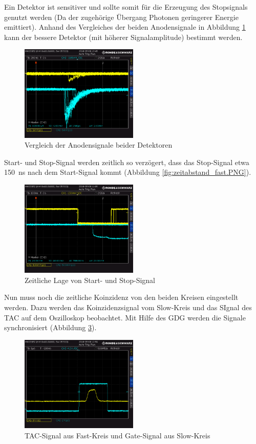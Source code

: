 Ein Detektor ist sensitiver und sollte somit für die Erzeugung des Stopsignals genutzt werden (Da der zugehörige Übergang Photonen geringerer Energie emittiert). Anhand des Vergleiches der beiden Anodensignale in Abbildung \ref{fig:detektorvergleich} kann der bessere Detektor (mit höherer Signalamplitude) bestimmt werden.
\begin{figure}[h]
  \centering
  \includegraphics[width=0.5\textwidth]{data/oszi/detektorvergleich.PNG}
  \caption{Vergleich der Anodensignale beider Detektoren}
  \label{fig:detektorvergleich}
\end{figure}

Start- und Stop-Signal werden zeitlich so verzögert, dass das Stop-Signal etwa \SI{150}{\nano\second} nach dem Start-Signal kommt (Abbildung \ref{fig:zeitabstand_fast.PNG}). 
\newpage
\begin{figure}[h]
  \centering
  \includegraphics[width=0.5\textwidth]{data/oszi/zeitabstand_fast.PNG}
  \caption{Zeitliche Lage von Start- und Stop-Signal}
  \label{fig:zeitabstand_fast}
\end{figure}

Nun muss noch die zeitliche Koinzidenz von den beiden Kreisen eingestellt werden. Dazu werden das Koinzidenzsignal vom Slow-Kreis und das SIgnal des TAC auf dem Oszilloskop beobachtet. Mit Hilfe des GDG werden die Signale synchronisiert (Abbildung \ref{fig:fast_und_slow}).
\begin{figure}[h]
  \centering
  \includegraphics[width=0.5\textwidth]{data/oszi/fast_und_slow.PNG}
  \caption{TAC-Signal aus Fast-Kreis und Gate-Signal aus Slow-Kreis}
  \label{fig:fast_und_slow}
\end{figure}

